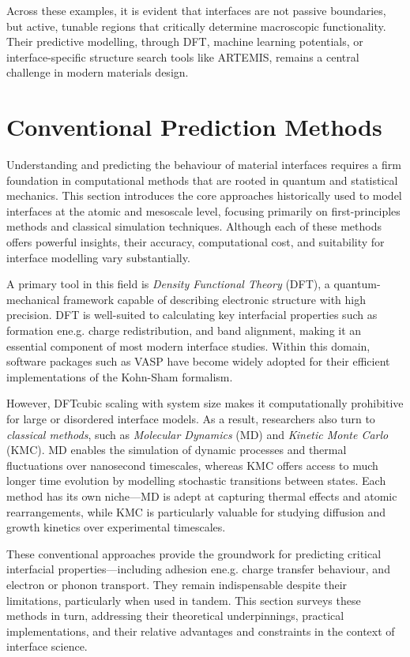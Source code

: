 Across these examples, it is evident that interfaces are not passive boundaries, but active, tunable regions that
critically determine macroscopic functionality. Their predictive modelling, through DFT, machine learning
potentials, or interface-specific structure search tools like ARTEMIS, remains a central challenge in modern
materials design.


\section{Conventional Prediction Methods}
\label{section:conventional_methods}

Understanding and predicting the behaviour of material interfaces requires a firm foundation in computational
methods that are rooted in quantum and statistical mechanics. This section introduces the core approaches
historically used to model interfaces at the atomic and mesoscale level, focusing primarily on first-principles
methods and classical simulation techniques. Although each of these methods offers powerful insights, their
accuracy, computational cost, and suitability for interface modelling vary substantially.

A primary tool in this field is \textit{Density Functional Theory} (DFT), a quantum-mechanical framework capable of
describing electronic structure with high precision. DFT is well-suited to calculating key interfacial properties
such as formation ene.g. charge redistribution, and band alignment, making it an essential component of most modern
interface studies. Within this domain, software packages such as \textsc{VASP} have become widely adopted for their
efficient implementations of the Kohn-Sham formalism.

However, DFT\rqss cubic scaling with system size makes it computationally prohibitive for large or disordered interface
models. As a result, researchers also turn to \textit{classical methods}, such as \textit{Molecular Dynamics} (MD)
and \textit{Kinetic Monte Carlo} (KMC). MD enables the simulation of dynamic processes and thermal fluctuations over
nanosecond timescales, whereas KMC offers access to much longer time evolution by modelling stochastic transitions
between states. Each method has its own niche---MD is adept at capturing thermal effects and atomic rearrangements,
while KMC is particularly valuable for studying diffusion and growth kinetics over experimental timescales.

These conventional approaches provide the groundwork for predicting critical interfacial properties---including
adhesion ene.g. charge transfer behaviour, and electron or phonon transport. They remain indispensable despite their
limitations, particularly when used in tandem. This section surveys these methods in turn, addressing their
theoretical underpinnings, practical implementations, and their relative advantages and constraints in the context
of interface science.

